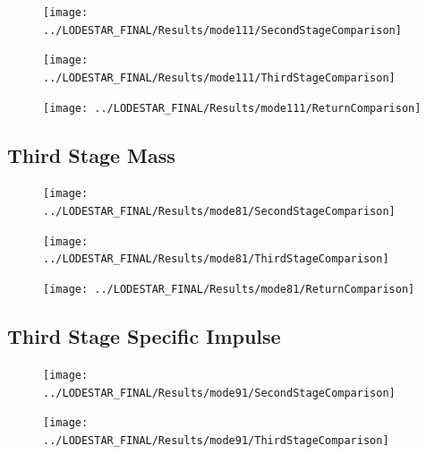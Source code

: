 \begin{figure}[th]
\centering
\texttt{[image: ../LODESTAR\_FINAL/Results/mode111/SecondStageComparison]}
\caption{}
\label{fig:SecondStageComparison13}
\end{figure}

\begin{figure}[th]
\centering
\texttt{[image: ../LODESTAR\_FINAL/Results/mode111/ThirdStageComparison]}
\caption{}
\label{fig:ThirdStageComparison13}
\end{figure}

\begin{figure}[th]
\centering
\texttt{[image: ../LODESTAR\_FINAL/Results/mode111/ReturnComparison]}
\caption{}
\label{fig:ReturnComparison13}
\end{figure}



\subsection{Third Stage Mass}\label{sec:app_comparison81}
\begin{figure}[th]
\centering
\texttt{[image: ../LODESTAR\_FINAL/Results/mode81/SecondStageComparison]}
\caption{}
\label{fig:SecondStageComparison14}
\end{figure}

\begin{figure}[th]
\centering
\texttt{[image: ../LODESTAR\_FINAL/Results/mode81/ThirdStageComparison]}
\caption{}
\label{fig:ThirdStageComparison14}
\end{figure}



\begin{figure}[th]
	\centering
	\texttt{[image: ../LODESTAR\_FINAL/Results/mode81/ReturnComparison]}
	\caption{}
	\label{fig:ReturnComparison14}
\end{figure}

\subsection{Third Stage Specific Impulse}\label{sec:app_comparison91}

\begin{figure}[th]
\centering
\texttt{[image: ../LODESTAR\_FINAL/Results/mode91/SecondStageComparison]}
\caption{}
\label{fig:SecondStageComparison15}
\end{figure}


\begin{figure}[th]
\centering
\texttt{[image: ../LODESTAR\_FINAL/Results/mode91/ThirdStageComparison]}
\caption{}
\label{fig:ThirdStageComparison15}
\end{figure}


